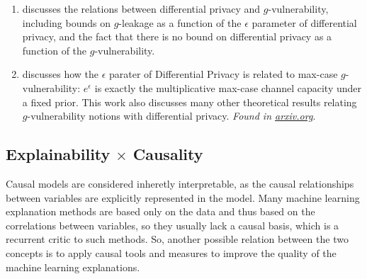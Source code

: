 \begin{enumerate}
\item \cite{alvim2015information} discusses the relations between differential privacy and $g$-vulnerability, including bounds on $g$-leakage as a function of the $\epsilon$ parameter of differential privacy, and the fact that there is no bound on differential privacy as a function of the $g$-vulnerability.

\item \cite{fernandes2022explaining} discusses how the $\epsilon$ parater of Differential Privacy is related to max-case $g$-vulnerability: $e^\epsilon$ is exactly the multiplicative max-case channel capacity under a fixed prior. This work also discusses many other theoretical results relating $g$-vulnerability notions with differential privacy. \emph{Found in \url{arxiv.org}}.
\end{enumerate}

\subsection{Explainability $\times$ Causality}

Causal models are considered inheretly interpretable, as the causal relationships between variables are explicitly represented in the model. Many machine learning explanation methods are based only on the data and thus based on the correlations between variables, so they usually lack a causal basis, which is a recurrent critic to such methods. So, another possible relation between the two concepts is to apply causal tools and measures to improve the quality of the machine learning explanations.

